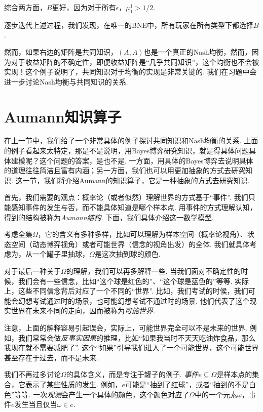 综合两方面，$B$更好，因为对于所有$\epsilon$，$\mu_1^1 > 1/2$. 

逐步迭代上述过程，我们发现，在唯一的BNE中，所有玩家在所有类型下都选择$B$. 

然而，如果右边的矩阵是共同知识，$(A,A)$也是一个真正的Nash均衡，然而，因为对于收益矩阵的不确定性，即便收益矩阵是“几乎共同知识”，这个均衡也不会被实现！这个例子说明了，共同知识对于均衡的实现是非常关键的. 我们在习题中会进一步讨论Nash均衡与共同知识的关系.

\section{Aumann知识算子}

在上一节中，我们给了一个非常具体的例子探讨共同知识和Nash均衡的关系. 上面的例子看起来太特定，那是不是说明，用Bayes博弈研究知识，就是得具体问题具体建模呢？这个问题的答案，是也不是. 一方面，用具体的Bayes博弈去说明具体的道理往往简洁且富有内涵；另一方面，我们也可以用更加抽象的方式去研究知识. 这一节，我们将介绍Aumann的知识算子，它是一种抽象的方式去研究知识.

首先，我们需要的观点：概率论（或者似然）理解世界的方式基于“事件”. 我们只能感知事件的发生与否，而不能具体知道是哪个样本点. 用事件的方式理解认知，得到的结构被称为\textit{Aumann结构}. 下面，我们具体介绍这一数学模型. 

考虑全集$\Omega$，它的含义有多种多样，比如可以理解为样本空间（概率论视角）、状态空间（动态博弈视角）或者可能世界（信念的视角出发）的全体. 我们就具体考虑为，从一个罐子里抽球，$\Omega$是这次抽到球的颜色. 

对于最后一种关于$\Omega$的理解，我们可以再多解释一些. 当我们面对不确定性的时候，我们会有一些信念，比如“这个球是红色的”、“这个球是蓝色的”等等. 实际上，这些不同信念背后对应了一个不同的“世界”. 比如，我们考试的时候，我们可能会幻想考试通过时的场景，也可能幻想考试不通过时的场景. 他们代表了这个现实世界在未来不同的走向，因而被称为\textit{可能世界}.

注意，上面的解释容易引起误会，实际上，可能世界完全可以不是未来的世界. 例如，我们常常会做\textit{反事实因果}的推理，比如“如果我当时不天天吃油炸食品，那么我现在就不需要减肥了”. 这个“如果”引导我们进入了一个可能世界，这个可能世界甚至存在于过去，而不是未来.

我们不再过多讨论$\Omega$的具体含义，而是专注于罐子的例子. \textit{事件}$e\subseteq \Omega$是样本点的集合，它表示了某些性质的发生. 例如，$e$可能是“抽到了红球”，或者“抽到的不是白色”等等. 一次\textit{观测}会产生一个具体的颜色，这个颜色对应了$\Omega$中的一个元素$\omega$，事件$e$发生当且仅当$\omega\in e$.

